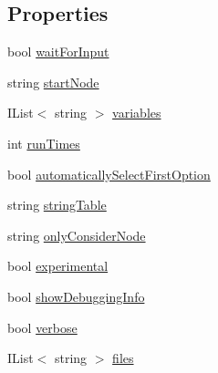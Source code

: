 \subsection*{Properties}
\begin{DoxyCompactItemize}
\item 
bool \hyperlink{a00159_a4b385e83338d14947c4d840d2d1ee266}{wait\-For\-Input}
\item 
string \hyperlink{a00159_a785bd0f1c8b6674e7a1cfbe38c29b961}{start\-Node}
\item 
I\-List$<$ string $>$ \hyperlink{a00159_a2222c73ce5366b02490c6123b711f596}{variables}
\item 
int \hyperlink{a00159_a525bb1890b29f86002c2f163ace4a3d8}{run\-Times}
\item 
bool \hyperlink{a00159_ae21d271c37dabee023771a951f6e774e}{automatically\-Select\-First\-Option}
\item 
string \hyperlink{a00105_a7e43c3b73722956cb0f5d507e4eef527}{string\-Table}
\item 
string \hyperlink{a00105_af4c0062a1d46281d377f87084fde374e}{only\-Consider\-Node}
\item 
bool \hyperlink{a00105_ad97950e47ce2aaeb598295b7c3c44b13}{experimental}
\item 
bool \hyperlink{a00043_a89964ea17bd19caf00cb5bff563ed01c}{show\-Debugging\-Info}
\item 
bool \hyperlink{a00043_ada4d83d1756918f362d55f6649b82b17}{verbose}
\item 
I\-List$<$ string $>$ \hyperlink{a00043_aa93cbb1bc1d5328e0a417012621e92d2}{files}
\end{DoxyCompactItemize}


